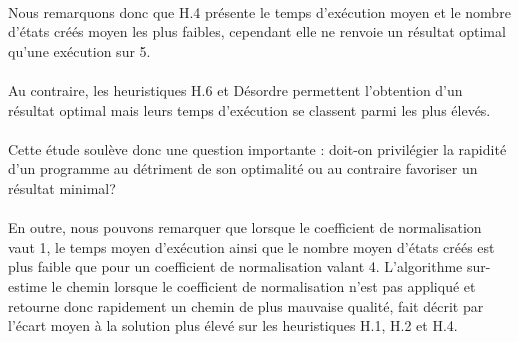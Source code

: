 \documentclass[10pt,a4paper]{report}
\begin{document}

\paragraph{}{Nous remarquons donc que H.4 présente le temps d'exécution moyen et le nombre d'états créés moyen les plus faibles, cependant elle ne renvoie un résultat optimal qu'une exécution sur 5.}

\paragraph{}{Au contraire, les heuristiques H.6 et Désordre permettent l'obtention d'un résultat optimal mais leurs temps d'exécution se classent parmi les plus élevés.}

\paragraph{}{Cette étude soulève donc une question importante : doit-on privilégier la rapidité d'un programme au détriment de son optimalité ou au contraire favoriser un résultat minimal?}

\paragraph{}{En outre, nous pouvons remarquer que lorsque le coefficient de normalisation vaut 1, le temps moyen d'exécution ainsi que le nombre moyen d'états créés est plus faible que pour un coefficient de normalisation valant 4. L'algorithme sur-estime le chemin lorsque le coefficient de normalisation n'est pas appliqué et retourne donc rapidement un chemin de plus mauvaise qualité, fait décrit par l'écart moyen à la solution plus élevé sur les heuristiques H.1, H.2 et H.4.}
\end{document}
